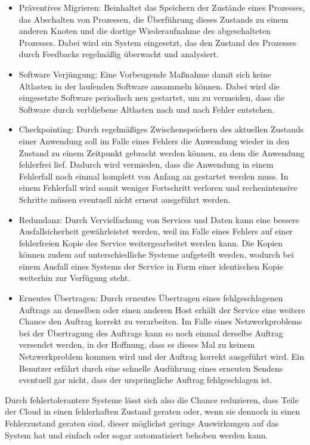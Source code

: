 \begin{itemize}
\item
Präventives Migrieren: Beinhaltet das Speichern der Zustände eines Prozesses, das Abschalten von Prozessen, die Überführung dieses Zustands zu einem anderen Knoten und die dortige Wiederaufnahme des abgeschalteten Prozesses.
Dabei wird ein System eingesetzt, das den Zustand des Prozesses durch Feedbacks regelmäßig überwacht und analysiert. 
\item
Software Verjüngung: Eine Vorbeugende Maßnahme damit sich keine Altlasten in der laufenden Software ansammeln können. Dabei wird die eingesetzte Software periodisch neu gestartet, um zu vermeiden, dass die Software durch verbliebene Altlasten nach und nach Fehler entstehen.
\item
Checkpointing: Durch regelmäßiges Zwischenspeichern des aktuellen Zustands einer Anwendung soll im Falle eines Fehlers die Anwendung wieder in den Zustand zu einem Zeitpunkt gebracht werden können, zu dem die Anwendung fehlerfrei lief. Dadurch wird vermieden, dass die Anwendung in einem Fehlerfall noch einmal komplett von Anfang an gestartet werden muss. In einem Fehlerfall wird somit weniger Fortschritt verloren und rechenintensive Schritte müssen eventuell nicht erneut ausgeführt werden.
\item
Redundanz: Durch Vervielfachung von Services und Daten kann eine bessere Ausfallsicherheit gewährleistet werden, weil im Falle eines Fehlers auf einer fehlerfreien Kopie des Service weitergearbeitet werden kann. Die Kopien können zudem auf unterschiedliche Systeme aufgeteilt werden, wodurch bei einem Ausfall eines Systems der Service in Form einer identischen Kopie weiterhin zur Verfügung steht.
\item
Erneutes Übertragen: Durch erneutes Übertragen eines fehlgeschlagenen Auftrags an denselben oder einen anderen Host erhält der Service eine weitere Chance den Auftrag korrekt zu verarbeiten. Im Falle eines Netzwerkproblems bei der Übertragung des Auftrags kann so noch einmal derselbe Auftrag versendet werden, in der Hoffnung, dass es dieses Mal zu keinem Netzwerkproblem kommen wird und der Auftrag korrekt ausgeführt wird. Ein Benutzer erfährt durch eine schnelle Ausführung eines erneuten Sendens eventuell gar nicht, dass der ursprüngliche Auftrag fehlgeschlagen ist.
\end{itemize}

Durch fehlertolerantere Systeme lässt sich also die Chance reduzieren, dass Teile der Cloud in einen fehlerhaften Zustand geraten oder, wenn sie dennoch in einen Fehlerzustand geraten sind, dieser möglichst geringe Auswirkungen auf das System hat und einfach oder sogar automatisiert behoben werden kann.

